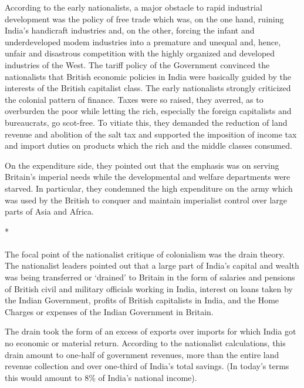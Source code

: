 \begin{multicols}{2}
According to the early nationalists, a major obstacle to rapid industrial development was the policy of free trade which was, on the one hand, ruining India's handicraft industries and, on the other, forcing the infant and underdeveloped modem industries into a premature and unequal and, hence, unfair and disastrous competition with the highly organized and developed industries of the West. The tariff policy of the Government convinced the nationalists that British economic policies in India were basically guided by the interests of the British capitalist class. The early nationalists strongly criticized the colonial pattern of finance. Taxes were so raised, they averred, as to overburden the poor while letting the rich, especially the foreign capitalists and bureaucrats, go scot-free. To vitiate this, they demanded the reduction of land revenue and abolition of the salt tax and supported the imposition of income tax and import duties on products which the rich and the middle classes consumed.

On the expenditure side, they pointed out that the emphasis was on serving Britain's imperial needs while the developmental and welfare departments were starved. In particular, they condemned the high expenditure on the army which was used by the British to conquer and maintain imperialist control over large parts of Asia and Africa.

\begin{center}*\end{center}

\paragraph*{}

The focal point of the nationalist critique of colonialism was the drain theory. The nationalist leaders pointed out that a large part of India's capital and wealth was being transferred or `drained' to Britain in the form of salaries and pensions of British civil and military officials working in India, interest on loans taken by the Indian Government, profits of British capitalists in India, and the Home Charges or expenses of the Indian Government in Britain.

The drain took the form of an excess of exports over imports for which India got no economic or material return. According to the nationalist calculations, this drain amount to one-half of government revenues, more than the entire land revenue collection and over one-third of India's total savings. (In today's terms this would amount to 8\% of India's national income).


\end{multicols}
